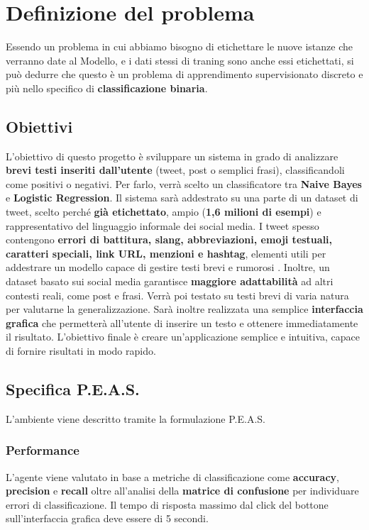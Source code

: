\documentclass[12pt,a4paper]{report} %
\begin{document}
\chapter{Definizione del problema}
Essendo un problema in cui abbiamo bisogno di etichettare le nuove istanze che verranno date al Modello, e i dati stessi di traning sono anche essi etichettati, si può dedurre che questo è un problema di apprendimento supervisionato discreto e più nello specifico di \textbf{classificazione binaria}.
\section{Obiettivi}
L’obiettivo di questo progetto è sviluppare un sistema in grado di analizzare \textbf{brevi testi inseriti dall’utente} (tweet, post o semplici frasi), classificandoli come positivi o negativi. Per farlo, verrà scelto un classificatore tra  \textbf{Naive Bayes} e \textbf{Logistic Regression}.
Il sistema sarà addestrato su una parte di un dataset di tweet, scelto perché \textbf{già etichettato}, ampio (\textbf{1,6 milioni di esempi}) e rappresentativo del linguaggio informale dei social media. I tweet spesso contengono \textbf{errori di battitura, slang, abbreviazioni, emoji testuali, caratteri speciali, link URL, menzioni e hashtag}, elementi utili per addestrare un modello capace di gestire testi brevi e rumorosi . Inoltre, un dataset basato sui social media garantisce \textbf{maggiore adattabilità} ad altri contesti reali, come post e frasi. Verrà poi testato su testi brevi di varia natura per valutarne la generalizzazione. 
Sarà inoltre realizzata una semplice \textbf{interfaccia grafica} che permetterà all’utente di inserire un testo e ottenere immediatamente il risultato. L’obiettivo finale è creare un’applicazione semplice e intuitiva, capace di fornire risultati in modo rapido.
\section{Specifica P.E.A.S.}
L'ambiente viene descritto tramite la formulazione P.E.A.S.
\subsection{Performance}
L'agente viene valutato in base a metriche di classificazione come \textbf{accuracy}, \textbf{precision} e \textbf{recall} oltre all'analisi della \textbf{matrice di confusione }per individuare errori di classificazione. Il tempo di risposta massimo dal click del bottone sull'interfaccia grafica deve essere di 5 secondi.
\end{document}
